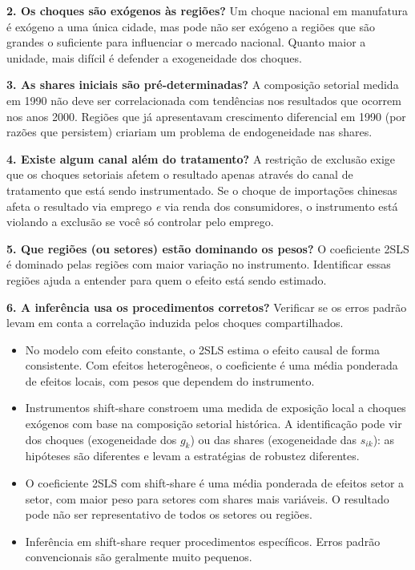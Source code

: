 \textbf{2. Os choques são exógenos às regiões?} Um choque nacional em manufatura é exógeno a uma única cidade, mas pode não ser exógeno a regiões que são grandes o suficiente para influenciar o mercado nacional. Quanto maior a unidade, mais difícil é defender a exogeneidade dos choques.

\textbf{3. As shares iniciais são pré-determinadas?} A composição setorial medida em 1990 não deve ser correlacionada com tendências nos resultados que ocorrem nos anos 2000. Regiões que já apresentavam crescimento diferencial em 1990 (por razões que persistem) criariam um problema de endogeneidade nas shares.

\textbf{4. Existe algum canal além do tratamento?} A restrição de exclusão exige que os choques setoriais afetem o resultado apenas através do canal de tratamento que está sendo instrumentado. Se o choque de importações chinesas afeta o resultado via emprego \textit{e} via renda dos consumidores, o instrumento está violando a exclusão se você só controlar pelo emprego.

\textbf{5. Que regiões (ou setores) estão dominando os pesos?} O coeficiente 2SLS é dominado pelas regiões com maior variação no instrumento. Identificar essas regiões ajuda a entender para quem o efeito está sendo estimado.

\textbf{6. A inferência usa os procedimentos corretos?} Verificar se os erros padrão levam em conta a correlação induzida pelos choques compartilhados.

\begin{notabox}
\begin{itemize}[leftmargin=*]
  \item No modelo com efeito constante, o 2SLS estima o efeito causal de forma consistente. Com efeitos heterogêneos, o coeficiente é uma média ponderada de efeitos locais, com pesos que dependem do instrumento.
  \item Instrumentos shift-share constroem uma medida de exposição local a choques exógenos com base na composição setorial histórica. A identificação pode vir dos choques (exogeneidade dos $g_k$) ou das shares (exogeneidade das $s_{ik}$): as hipóteses são diferentes e levam a estratégias de robustez diferentes.
  \item O coeficiente 2SLS com shift-share é uma média ponderada de efeitos setor a setor, com maior peso para setores com shares mais variáveis. O resultado pode não ser representativo de todos os setores ou regiões.
  \item Inferência em shift-share requer procedimentos específicos. Erros padrão convencionais são geralmente muito pequenos.
\end{itemize}
\end{notabox}
